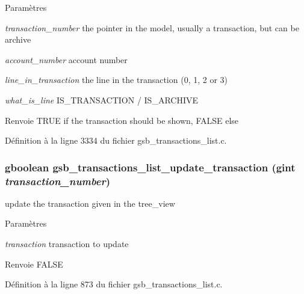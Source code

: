 \begin{DoxyParams}{Paramètres}
\item[{\em transaction\_\-number}]the pointer in the model, usually a transaction, but can be archive \item[{\em account\_\-number}]account number \item[{\em line\_\-in\_\-transaction}]the line in the transaction (0, 1, 2 or 3) \item[{\em what\_\-is\_\-line}]IS\_\-TRANSACTION / IS\_\-ARCHIVE\end{DoxyParams}
\begin{DoxyReturn}{Renvoie}
TRUE if the transaction should be shown, FALSE else 
\end{DoxyReturn}


Définition à la ligne 3334 du fichier gsb\_\-transactions\_\-list.c.

\subsubsection[{gsb\_\-transactions\_\-list\_\-update\_\-transaction}]{\setlength{\rightskip}{0pt plus 5cm}gboolean gsb\_\-transactions\_\-list\_\-update\_\-transaction (gint {\em transaction\_\-number})}\label{gsb__transactions__list_8h_a83f53b0c0b9da33efa7f7691ea939f9e}
update the transaction given in the tree\_\-view


\begin{DoxyParams}{Paramètres}
\item[{\em transaction}]transaction to update\end{DoxyParams}
\begin{DoxyReturn}{Renvoie}
FALSE 
\end{DoxyReturn}


Définition à la ligne 873 du fichier gsb\_\-transactions\_\-list.c.

